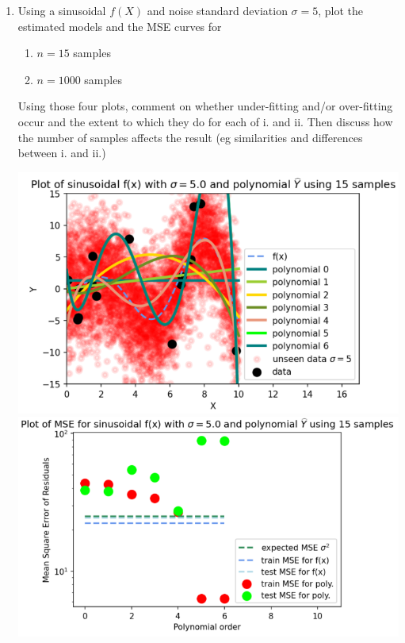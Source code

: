 \documentclass[12pt]{article}
\begin{document}
\begin{enumerate}[label=(\alph*)]
    \item Using a sinusoidal $f(X)$ and noise standard deviation $\sigma = 5$, plot the estimated models and the MSE curves for
          \begin{enumerate}[label=(\roman*)]
              \item $n = 15$ samples
              \item $ n = 1000$ samples
          \end{enumerate}
          Using those four plots, comment on whether under-fitting and/or over-fitting occur and the extent to which they do for each of i. and ii. Then discuss how the number of samples affects the result (eg similarities and differences between i. and ii.)\\
          \begin{center}
              \includegraphics[width=1\textwidth]{sinosodial-15.png}
              \includegraphics[width=1\textwidth]{sinosodial-MSE-15.png}

\end{center}
\end{enumerate}
\end{document}
